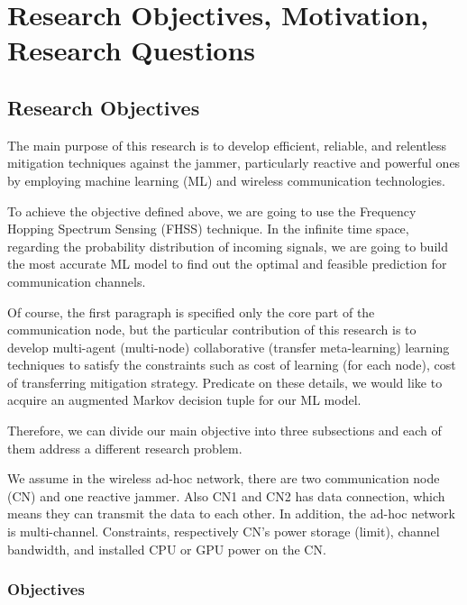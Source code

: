 \documentclass[letterpaper%
, twoside%
, 12pt%
,thesepararticles%
, english%
,creativecommons,hyperref, withAlgo2e%
]{thETS}
\begin{document}


\chapter{Research Objectives, Motivation, Research Questions}

\section{Research Objectives}

The main purpose of this research is to develop efficient, reliable, and relentless mitigation techniques against the jammer, particularly reactive and powerful ones by employing machine learning (ML) and wireless communication technologies. 

To achieve the objective defined above, we are going to use the Frequency Hopping Spectrum  Sensing (FHSS) technique. In the infinite time space, regarding the probability distribution of incoming signals, we are going to build the most accurate ML model to find out  the optimal and feasible prediction for communication channels.

Of course, the first paragraph is specified only the core part of the communication node, but the particular contribution of this research is to develop multi-agent (multi-node) collaborative (transfer meta-learning) learning techniques to satisfy the constraints such as cost of learning (for each node), cost of transferring mitigation strategy. Predicate on these details, we would like to acquire an augmented Markov decision tuple for our ML model.

Therefore, we can divide our main objective into three subsections and each of them address a different research problem.

We assume in the wireless ad-hoc network, there are two communication node (CN) and one reactive jammer. Also CN1 and CN2 has data connection, which means they can transmit the data to each other. In addition, the ad-hoc network is multi-channel. Constraints, respectively CN's power storage (limit), channel bandwidth, and installed CPU or GPU power on the CN. 

\subsection{Objectives}
\end{document}
